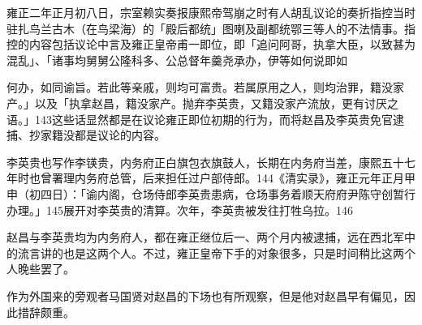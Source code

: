雍正二年正月初八日，宗室赖实奏报康熙帝驾崩之时有人胡乱议论的奏折指控当时驻扎鸟兰古木（在鸟梁海）的「殿后都统」图喇及副都统鄂三等人的不法情事。指控的内容包括议论中言及雍正皇帝甫一即位，即「追问阿哥，执拿大臣，以致甚为混乱」、「诸事均舅舅公隆科多、公总督年羹尧承办，伊等如何说即如

\vfill
\begin{BookNotes}
\end{BookNotes}

\noindent 何办，如同谕旨。若此等亲戚，则均可富贵。若属原用之人，则均治罪，籍没家产。」以及「执拿赵昌，籍没家产。抛弃李英贵，又籍没家产流放，更有讨厌之语。」143这些话显然都是在议论雍正即位初期的行为，而将赵昌及李英贵免官逮捕、抄家籍没都是议论的内容。

李英贵也写作李锳贵，内务府正白旗包衣旗鼓人，长期在内务府当差，康熙五十七年时也曾署理内务府总管，后来担任过户部侍郎。144《清实录》，雍正元年正月甲申（初四日）：「谕内阁，仓场侍郎李英贵患病，仓场事务着顺天府府尹陈守创暂行办理。」145展开对李英贵的清算。次年，李英贵被发往打牲乌拉。146

赵昌与李英贵均为内务府人，都在雍正继位后一、两个月内被逮捕，远在西北军中的流言讲的也是这两个人。不过，雍正皇帝下手的对象很多，只是时间稍比这两个人晚些罢了。

作为外国来的旁观者马国贤对赵昌的下场也有所观察，但是他对赵昌早有偏见，因此措辞颇重。

